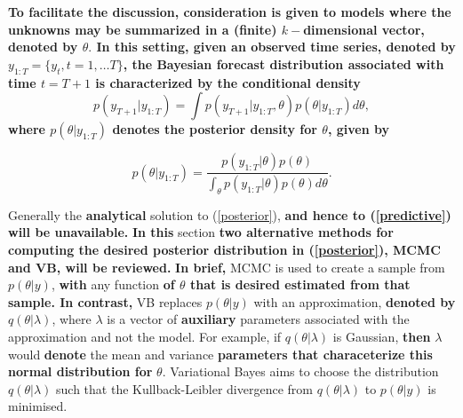\documentclass[12pt,a4paper]{article}%
\numberwithin{equation}{section}
\begin{document}
{\bf To facilitate the discussion, consideration is given to models where the unknowns may be summarized in a (finite) $k-$dimensional vector, denoted by $\theta.$ In this setting, given an observed time series, denoted by $y_{1:T}= \{y_{t}, t = 1, \dots T\}$, the Bayesian forecast distribution associated with time $t=T+1$ is characterized by the conditional density }
\begin{equation}
\label{predictive}
p(y_{T+1} | y_{1:T}) =\int p(y_{T+1}|y_{1:T},\theta) p(\theta|y_{1:T}) d\theta,
\end{equation}
{\bf where $p(\theta|y_{1:T})$ denotes the posterior density for $\theta$, given by}

\begin{equation}
\label{posterior}
 p(\theta | y_{1:T}) = \frac{p(y_{1:T}|\theta)p(\theta)}{\int_\theta p(y_{1:T}|\theta)p(\theta) d\theta}.
\end{equation}

Generally the {\bf analytical} solution to (\ref{posterior}), 
{\bf and hence to (\ref{predictive}) will be unavailable.} 	%
{\bf In this} section {\bf two alternative methods for computing the desired posterior distribution in (\ref{posterior}),  MCMC and VB, will be reviewed.}
{\bf In brief,} MCMC is used to create a sample from $p(\theta | y)$, {\bf with} any function {\bf of $\theta$ that is desired estimated from that sample. In contrast,} VB replaces $p(\theta | y)$ with an approximation,
{\bf denoted by} $q(\theta | \lambda)$, where $\lambda$ is a vector of {\bf auxiliary} parameters associated with the approximation and not the model. 
For example, if $q(\theta | \lambda)$ is Gaussian,
{\bf then} $\lambda$ would {\bf denote} the mean and variance {\bf parameters that characeterize this normal distribution for} $\theta$. Variational Bayes aims to choose the distribution $q(\theta | \lambda)$ such that the Kullback-Leibler divergence from $q(\theta | \lambda)$ to $p(\theta | y)$ is minimised.
\end{document}
